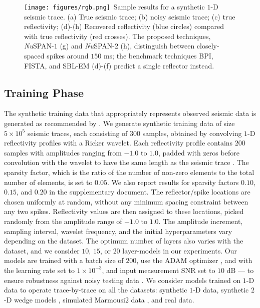\documentclass[journal]{IEEEtran}
\newcommand{\rgbsymbol}{\texttt{[image: figures/rgb.png]}}
\begin{document}
\begin{figure*}[!ht]
    \centering
    \caption{\protect\rgbsymbol~Sample results for a synthetic $1$-D seismic trace. (a) True seismic trace; (b) noisy seismic trace; (c) true reflectivity; (d)-(h) Recovered reflectivity (blue circles) compared with true reflectivity (red crosses). The proposed techniques, {\it Nu}SPAN-$1$ (g) and {\it Nu}SPAN-$2$ (h), distinguish between closely-spaced spikes around $150$ ms; the benchmark techniques BPI, FISTA, and SBL-EM (d)-(f) predict a single reflector instead.}
    \label{fig:trace}
\end{figure*}

\subsection{Training Phase}
The synthetic training data that appropriately represents observed seismic data is generated as recommended by \cite{kim2018geophysical}. We generate synthetic training data of size $5 \times 10^{5}$ seismic traces, each consisting of $300$ samples, obtained by convolving $1$-D reflectivity profiles with a Ricker wavelet. Each reflectivity profile contains $200$ samples with amplitudes ranging from $-1.0$ to $1.0$, padded with zeros before convolution with the wavelet to have the same length as the seismic trace \cite{russell2019machine}. The sparsity factor, which is the ratio of the number of non-zero elements to the total number of elements, is set to $0.05$. We also report results for sparsity factors $0.10$, $0.15$, and $0.20$ in the supplementary document. The reflector/spike locations are chosen uniformly at random, without any minimum spacing constraint between any two spikes. Reflectivity values are then assigned to these locations, picked randomly from the amplitude range of $-1.0$ to $1.0$. The amplitude increment, sampling interval, wavelet frequency, and the initial hyperparameters vary depending on the dataset. The optimum number of layers also varies with the dataset, and we consider $10$, $15$, or $20$ layer-models in our experiments. Our models are trained with a batch size of $200$, use the ADAM optimizer \cite{kingma2014adam}, and with the learning rate set to $1 \times 10^{-3}$, and input measurement SNR set to $10$ dB --- to ensure robustness against noisy testing data \cite{kim2018geophysical}. We consider models trained on $1$-D data to operate trace-by-trace on all the datasets: synthetic $1$-D data, synthetic $2$-D wedge models \cite{hamlyn2014thin}, simulated Marmousi$2$ data \cite{martin2006marmousi2}, and real data.
\end{document}
